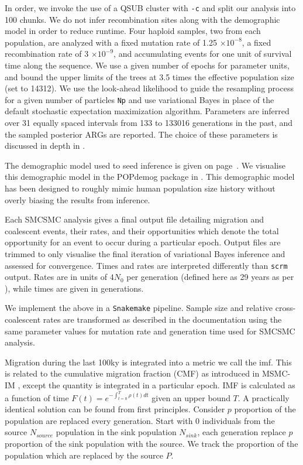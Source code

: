 In order, we invoke the use of a QSUB cluster with {\tt -c} and split our analysis into 100 chunks. We do not infer recombination sites along with the demographic model in order to reduce runtime. Four haploid samples, two from each population, are analyzed with a fixed mutation rate of 1.25 $\times 10^{-8}$, a fixed recombination rate of 3 $\times 10^{-9}$, and accumulating events for one unit of survival time along the sequence. We use a given number of epochs for parameter units, and bound the upper limits of the trees at 3.5 times the effective population size (set to 14312). We use the look-ahead likelihood to guide the resampling process for a given number of particles {\tt Np} and use variational Bayes in place of the default stochastic expectation maximization algorithm. Parameters are inferred over 31 equally spaced intervals from 133 to 133016 generations in the past, and the sampled posterior ARGs are reported. The choice of these parameters is discussed in depth in \cite{10.1371/journal.pone.0247647}. 

The demographic model used to seed inference is given on page~\pageref{app:dem_model:seed}. We visualise this demographic model in the POPdemog package in  \cite{Zhou2018}. This demographic model has been designed to roughly mimic human population size history without overly biasing the results from inference. 

Each SMCSMC analysis gives a final output file detailing migration and coalescent events, their rates, and their opportunities which denote the total opportunity for an event to occur during a particular epoch. Output files are trimmed to only visualise the final iteration of variational Bayes inference and assessed for convergence. Times and rates are interpreted differently than {\tt scrm} output. Rates are in units of $4N_0$ per generation (defined here as 29 years as per \cite{Fenner2005}), while times are given in generations. 

We implement the above in a {\tt Snakemake} pipeline. Sample size and relative cross-coalescent rates are transformed as described in the documentation using the same parameter values for mutation rate and generation time used for SMCSMC analysis.


Migration during the last 100ky is integrated into a metric we call the \gls{imf}. This is related to the cumulative migration fraction (CMF) as introduced in MSMC-IM \cite{Wang2019a}, except the quantity is integrated in a particular epoch. IMF is calculated as a function of time $F(t) = e^{- \int_{t=0}^T \rho(t) dt}$ given an upper bound $T$. A practically identical solution can be found from first principles. Consider $p$ proportion of the population are replaced every generation. Start with 0 individuals from the source $N_{source}$ population in the sink population $N_{sink}$, each generation replace $p$ proportion of the sink population with the source. We track the proportion of the population which are replaced by the source $P$.  


